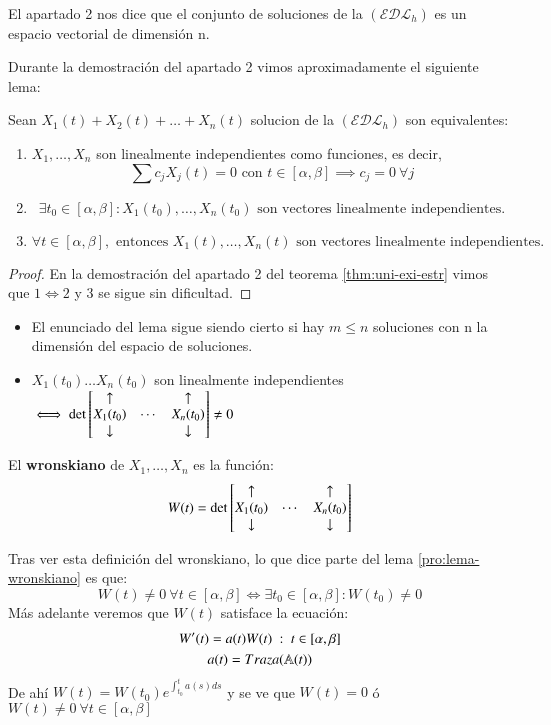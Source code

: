 \begin{obs}
    El apartado 2 nos dice que el conjunto de soluciones de la $(\mathcal{EDL}_h)$ es un espacio vectorial de dimensión n.
\end{obs}
Durante la demostración del apartado 2 vimos aproximadamente el siguiente lema:
\begin{pro}\label{pro:lema-wronskiano}
    Sean $X_1(t) + X_2(t) + \ldots + X_n(t)$ solucion de la $(\mathcal{EDL}_h)$ son equivalentes:\\
    \begin{enumerate}
        \item $X_1, \ldots, X_n$ son linealmente independientes como funciones, es decir,
        $$\sum c_j X_j (t) = 0 \text{ con } t \in [\alpha, \beta] \implies c_j = 0 \ \forall j$$
        \item
        $$
            \exists t_0 \in [\alpha, \beta] : X_1(t_0), \ldots, X_n(t_0) \text{ son vectores linealmente independientes.}
        $$
        \item
        $$
            \forall t \in [\alpha, \beta], \text{ entonces } X_1(t), \ldots, X_n(t) \text{ son vectores linealmente independientes.}
        $$
    \end{enumerate}
\end{pro}
\begin{proof}
    En la demostración del apartado 2 del teorema \ref{thm:uni-exi-estr} vimos que $1 \iff 2$ y $3$ se sigue sin dificultad.
\end{proof}
\begin{obs}
    \begin{itemize}
    \item El enunciado del lema sigue siendo cierto si hay $m \leq n$ soluciones con n la dimensión del espacio de soluciones.
    \item $X_1(t_0) \ldots X_n(t_0)$ son linealmente independientes $\iff \det \left[\begin{matrix}\uparrow && \uparrow\\ X_1(t_0) & \cdots & X_n(t_0) \\ \downarrow && \downarrow\end{matrix}\right] \neq 0$
    \end{itemize}
\end{obs}
\begin{dfn}[Wronskiano]
    El \textbf{wronskiano} de $X_1,  \ldots, X_n$ es la función:
    $$
        W(t) = \det \left[\begin{matrix}\uparrow && \uparrow\\ X_1(t_0) & \cdots & X_n(t_0) \\ \downarrow && \downarrow\end{matrix}\right]
    $$
\end{dfn}
Tras ver esta definición del wronskiano, lo que dice parte del lema \ref{pro:lema-wronskiano} es que:
$$
    W(t) \neq 0\ \forall t \in [\alpha, \beta] \iff \exists t_0 \in [\alpha, \beta] : W(t_0) \neq 0
$$
Más adelante veremos que $W(t)$ satisface la ecuación:
\begin{gather*}
    W'(t) = a(t) W(t)\ :\ t\in [\alpha, \beta]\\
    a(t) = Traza(\mathbb{A}(t))
\end{gather*}
De ahí $W(t) = W(t_0) e^{\int_{t_0}^{t} a(s) ds}$ y se ve que $W(t) = 0$ ó $W(t) \neq 0\ \forall t\in [\alpha, \beta]$


